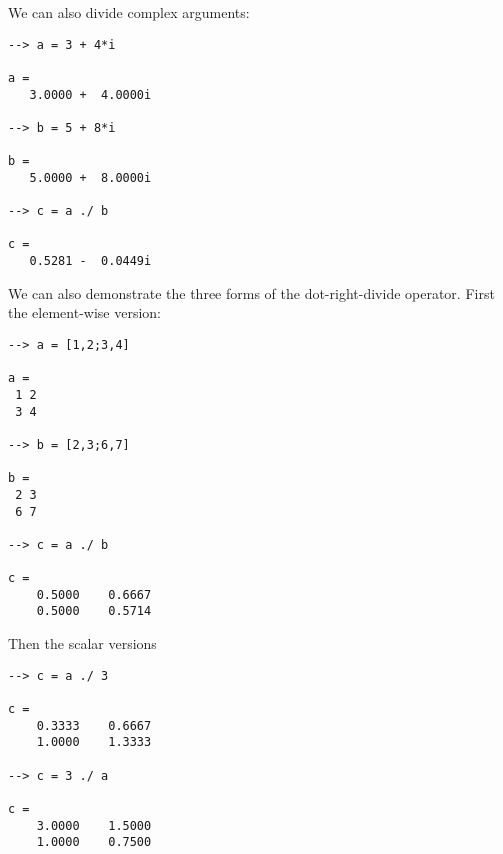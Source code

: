 We can also divide complex arguments:
\begin{verbatim}
--> a = 3 + 4*i

a = 
   3.0000 +  4.0000i 

--> b = 5 + 8*i

b = 
   5.0000 +  8.0000i 

--> c = a ./ b

c = 
   0.5281 -  0.0449i 
\end{verbatim}
We can also demonstrate the three forms of the dot-right-divide operator.  First
the element-wise version:
\begin{verbatim}
--> a = [1,2;3,4]

a = 
 1 2 
 3 4 

--> b = [2,3;6,7]

b = 
 2 3 
 6 7 

--> c = a ./ b

c = 
    0.5000    0.6667 
    0.5000    0.5714 
\end{verbatim}
Then the scalar versions
\begin{verbatim}
--> c = a ./ 3

c = 
    0.3333    0.6667 
    1.0000    1.3333 

--> c = 3 ./ a

c = 
    3.0000    1.5000 
    1.0000    0.7500 
\end{verbatim}

